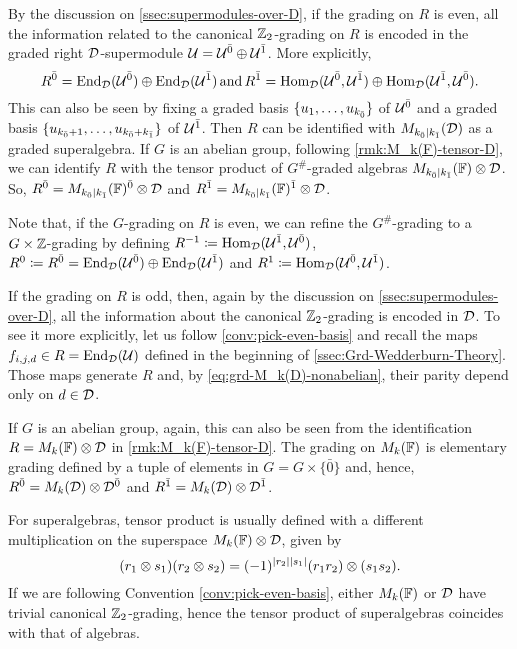 By the discussion on \cref{ssec:supermodules-over-D}, if the grading on $R$ is even, all the information related to the canonical $\mathbb{Z}_2$-grading on $R$ is encoded in the graded right $\mathcal{D}$-supermodule $\mathcal U=\mathcal U^{\bar0} \oplus \mathcal U^{\bar1}$. 
More explicitly, 
\[\label{eq:almost-ZZ-grading}
    R^{\bar0} = \operatorname{End}_{\mathcal{D}}(\mathcal U^{\bar0}) \oplus \operatorname{End}_{\mathcal{D}}(\mathcal U^{\bar1}) \,\text{and}\, R^{\bar1} = \operatorname{Hom}_{\mathcal{D}}(\mathcal U^{\bar0}, \mathcal U^{\bar1}) \oplus \operatorname{Hom}_{\mathcal{D}}(\mathcal U^{\bar1}, \mathcal U^{\bar0}).
\]
This can also be seen by fixing a graded basis $\{u_1, \ldots, u_{k_{\bar{0}}}\}$ of $\mathcal U^{\bar0}$ and a graded basis $\{u_{k_{\bar{0}} + 1}, \ldots, u_{k_{\bar{0}} + k_{\bar{1}}}\}$ of $\mathcal U^{\bar1}$. 
Then $R$ can be identified with $M_{k_{\bar{0}} \mid k_{\bar{1}}}(\mathcal{D})$ as a graded superalgebra. 
If $G$ is an abelian group, following \cref{rmk:M_k(F)-tensor-D}, we can identify $R$ with the tensor product of $G^\#$-graded algebras $M_{k_{\bar{0}} \mid k_{\bar{1}}}(\mathbb{F})\otimes \mathcal{D}$. 
So, $R^{\bar0} = M_{k_{\bar{0}} \mid k_{\bar{1}}}(\mathbb{F})^{\bar0} \otimes \mathcal{D}$ and $R^{\bar1} = M_{k_{\bar{0}} \mid k_{\bar{1}}}(\mathbb{F})^{\bar1} \otimes \mathcal{D}$. 

\begin{remark}\label{rmk:even-ZZ-grading}
    Note that, if the $G$-grading on $R$ is even, we can refine the $G^\#$-grading to a $G\times \mathbb{Z}$-grading by defining $R^{-1} \coloneqq \operatorname{Hom}_{\mathcal{D}} (\mathcal U^{\bar1}, \mathcal U^{\bar0})$, $R^0 \coloneqq R^{\bar0} = \operatorname{End}_{\mathcal{D}}(\mathcal U^{\bar0}) \oplus \operatorname{End}_{\mathcal{D}}(\mathcal U^{\bar1})$ and $R^1 \coloneqq \operatorname{Hom}_{\mathcal{D}} (\mathcal U^{\bar0}, \mathcal U^{\bar1})$. 
\end{remark}

If the grading on $R$ is odd, then, again by the discussion on \cref{ssec:supermodules-over-D}, all the information about the canonical $\mathbb{Z}_2$-grading is encoded in $\mathcal{D}$. 
To see it more explicitly, let us follow \cref{conv:pick-even-basis} and recall the maps $f_{i, j, d} \in R = \operatorname{End}_{\mathcal{D}} (\mathcal U)$ defined in the beginning of \cref{ssec:Grd-Wedderburn-Theory}. 
Those maps generate $R$ and, by \cref{eq:grd-M_k(D)-nonabelian}, their parity depend only on $d \in \mathcal{D}$. 

If $G$ is an abelian group, again, this can also be seen from the identification $R = M_k(\mathbb{F})\otimes \mathcal{D}$ in \cref{rmk:M_k(F)-tensor-D}. 
The grading on $M_k(\mathbb{F})$ is elementary grading defined by a tuple of elements in $G = G \times \{ \bar 0 \}$ and, hence, $R^{\bar0} = M_k(\mathcal{D}) \otimes \mathcal{D}^{\bar0}$ and $R^{\bar1} = M_k(\mathcal{D}) \otimes \mathcal{D}^{\bar1}$. 

\begin{remark}\label{rmk:M(D)=M(FF)-tensor-D}
	For superalgebras, tensor product is usually defined with a different multiplication on the superspace $M_k(\mathbb{F})\otimes \mathcal{D}$, given by \[(r_1 \otimes s_1) (r_2 \otimes s_2) = (-1)^{|r_2||s_1|} (r_1 r_2) \otimes (s_1 s_2).\]
	If we are following Convention \ref{conv:pick-even-basis}, either $M_k(\mathbb{F})$ or $\mathcal{D}$ have trivial canonical $\mathbb{Z}_2$-grading, hence the tensor product of superalgebras coincides with that of algebras.
\end{remark}

